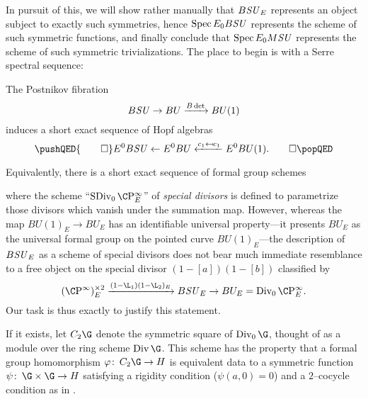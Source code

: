 \noindent In pursuit of this, we will show rather manually that \(B\mathit{SU}_E\) represents an object subject to exactly such symmetries, hence \(\operatorname{Spec} E_0 B\mathit{SU}\) represents the scheme of such symmetric functions, and finally conclude that \(\operatorname{Spec} E_0 M\mathit{SU}\) represents the scheme of such symmetric trivializations.  The place to begin is with a Serre spectral sequence:
\begin{lemma}\label{BSUtoBUtoCPinftyIsSexseq}
The Postnikov fibration \[B\mathit{SU} \to BU \xrightarrow{B\det} BU(1)\] induces a short exact sequence of Hopf algebras
\[\pushQED{\qed}
E^0 B\SU \from E^0 BU \xleftarrow{c_1 \mapsfrom c_1} E^0 BU(1). \qedhere
\popQED\]
\end{lemma}

\noindent Equivalently, there is a short exact sequence of formal group schemes
\begin{center}
\end{center}
where the scheme ``\(\SDiv_0 \CP^\infty_E\)'' of \textit{special divisors} is defined to parametrize those divisors which vanish under the summation map.  However, whereas the map \(BU(1)_E \to BU_E\) has an identifiable universal property---it presents \(BU_E\) as the universal formal group on the pointed curve \(BU(1)_E\)---the description of \(B\mathit{SU}_E\) as a scheme of special divisors does not bear much immediate resemblance to a free object on the special divisor \((1 - [a])(1 - [b])\) classified by \[(\CP^\infty)^{\times 2}_E \xrightarrow{(1 - \L_1)(1 - \L_2)_E} B\SU_E \to BU_E = \Div_0 \CP^\infty_E.\]  Our task is thus exactly to justify this statement.

\begin{definition}\label{DefinitionOfC2G}
If it exists, let \(C_2 \G\) denote the symmetric square of \(\Div_0 \G\), thought of as a module over the ring scheme \(\Div \G\).  This scheme has the property that a formal group homomorphism \(\phi\co C_2 \G \to H\) is equivalent data to a symmetric function \(\psi\co \G \times \G \to H\) satisfying a rigidity condition (\(\psi(a, 0) = 0\)) and a \(2\)--cocycle condition as in .
\end{definition}

